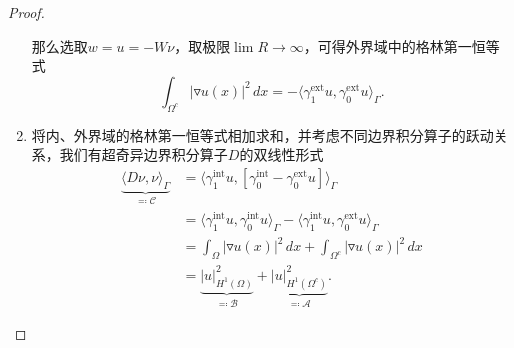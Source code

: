 \begin{proof}
\begin{enumerate}
那么选取$w = u = - W \nu$，取极限$\lim R \rightarrow \infty$，可得外界域中的格林第一恒等式
\begin{equation*}
  \int_{\Omega^{c}} \left| \triangledown u(x) \right|^{2} \, dx
  = - \langle \gamma_{1}^{\text{ext}} u, \gamma_{0}^{\text{ext}} u \rangle_{\Gamma}.
\end{equation*}

\item 将内、外界域的格林第一恒等式相加求和，并考虑不同边界积分算子的跃动关系，我们有超奇异边界积分算子$D$的双线性形式
\begin{equation*}
  \begin{split}
    \underbrace{
    \langle D \nu, \nu \rangle_{\Gamma}
    }_{\eqqcolon \mathcal{C}}
    & =
    \langle \gamma_{1}^{\text{int}} u,
    \left[ \gamma_{0}^{\text{int}} - \gamma_{0}^{\text{ext}} u \right]
    \rangle_{\Gamma} \\
    & =
    \langle \gamma_{1}^{\text{int}} u, \gamma_{0}^{\text{int}} u \rangle_{\Gamma}
    - \langle \gamma_{1}^{\text{int}} u, \gamma_{0}^{\text{ext}} u \rangle_{\Gamma} \\
    & =
    \int_{\Omega} \left| \triangledown u(x) \right|^{2} \, d x
    + \int_{\Omega^{c}} \left| \triangledown u(x) \right|^{2} \, d x \\
    & = \underbrace{
    \left| u \right|_{H^{1}(\Omega)}^{2}
    }_{\eqqcolon \mathcal{B}}
    + \underbrace{
    \left| u \right|_{H^{1}(\Omega^{c})}^{2}
    }_{\eqqcolon \mathcal{A}}
    .
  \end{split}
\end{equation*}


\end{enumerate}
\end{proof}

